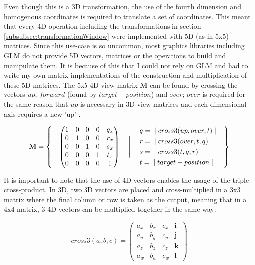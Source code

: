 \documentclass[11pt, a4paper]{article}
\begin{document}
Even though this is a 3D transformation, the use of the fourth dimension and homogenous coordinates is required to translate a set of coordinates. This meant that every 4D operation including the transformations in section \ref{subsubsec:transformationWindow} were implemented with 5D (as in 5x5) matrices. Since this use-case is so uncommon, most graphics libraries including GLM do not provide 5D vectors, matrices or the operations to build and manipulate them. It is because of this that I could not rely on GLM and had to write my own matrix implementations of the construction and multiplication of these 5D matrices. The 5x5 4D view matrix $\textbf{M}$ can be found by crossing the vectors $up$, $forward$ (found by $target - position$) and $over$; $over$ is required for the same reason that $up$ is necessary in 3D view matrices and each dimensional axis requires a new 'up' \parencite[\texttt{CameraND.h}]{truengine}.

\begin{equation*}
  \textbf{M} =
  \left\{\quad
  \begin{pmatrix}
  1 & 0 & 0 & 0 & q_x \\
  0 & 1 & 0 & 0 & r_x \\
  0 & 0 & 1 & 0 & s_x \\
  0 & 0 & 0 & 1 & t_x \\
  0 & 0 & 0 & 0 & 1
  \end{pmatrix}
  \quad \Biggm{|} \quad
  \begin{aligned}
    & q = \;|\; cross3(up, over, t) \;| \\
    & r = \;|\; cross3(over, t, q) \;| \\
    & s = \;|\; cross3(t, q, r) \;| \\
    & t = \;|\; target - position \;|
  \end{aligned}
  \quad\right\}
\end{equation*}

It is important to note that the use of 4D vectors enables the usage of the triple-cross-product. In 3D, two 3D vectors are placed and cross-multiplied in a 3x3 matrix where the final column or row is taken as the output, meaning that in a 4x4 matrix, 3 4D vectors can be multiplied together in the same way:

\begin{equation*}
  cross3(a, b, c) =
  \begin{pmatrix}
  a_x & b_x & c_x & \textbf{i} \\
  a_y & b_y & c_y & \textbf{j} \\
  a_z & b_z & c_z & \textbf{k} \\
  a_w & b_w & c_w & \textbf{l}
  \end{pmatrix}
\end{equation*}
\end{document}
